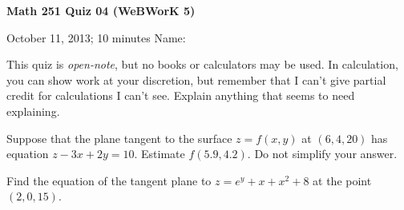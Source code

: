 \documentclass[12pt]{exam}
\begin{document}
\noindent
\textbf{{\large Math 251 \hfill Quiz 04 (WeBWorK 5)}}

\noindent
October 11, 2013; 10 minutes \hfill Name: \underline{\hspace{3in}} 

\noindent

\noindent
This quiz is \emph{open-note}, but no books or calculators may be used.
In calculation, you can show work at your discretion, but remember that
I can't give partial credit for calculations I can't see. Explain
anything that seems to need explaining.

\begin{questions} 

\question[4] Suppose that the plane tangent to the surface $z = f(x,y)$ at $(6, 4, 20)$ has equation $z - 3x + 2y = 10$. Estimate $f(5.9, 4.2)$. Do not simplify your answer.


\question[8] Find the equation of the tangent plane to $z = e^y + x + x^2 + 8$ at the point $(2, 0, 15)$.


\end{questions} 
\end{document}
